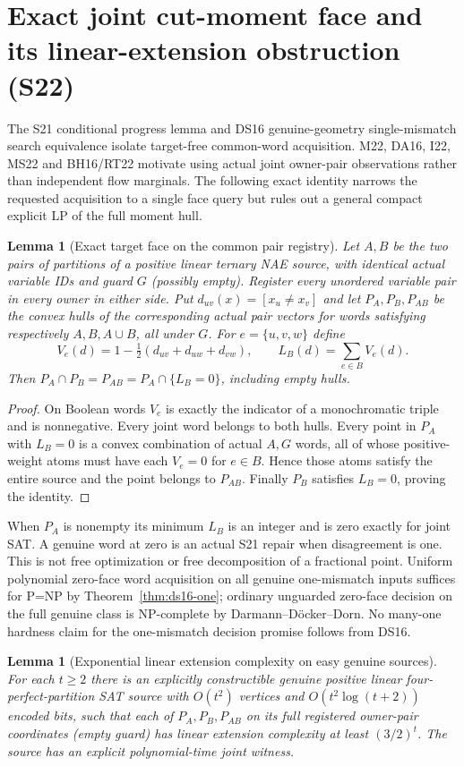 \documentclass[11pt]{article}
\newtheorem{lemma}[theorem]{Lemma}
\begin{document}
\section{Exact joint cut-moment face and its linear-extension obstruction (S22)}\label{sec:s22}
The S21 conditional progress lemma and DS16 genuine-geometry single-mismatch search equivalence isolate target-free common-word acquisition. M22, DA16, I22, MS22 and BH16/RT22 motivate using actual joint owner-pair observations rather than independent flow marginals. The following exact identity narrows the requested acquisition to a single face query but rules out a general compact explicit LP of the full moment hull.
\begin{lemma}[Exact target face on the common pair registry]\label{lem:s22-face}
Let $A,B$ be the two pairs of partitions of a positive linear ternary NAE source, with identical actual variable IDs and guard $G$ (possibly empty). Register every unordered variable pair in every owner in either side. Put $d_{uv}(x)=[x_u\ne x_v]$ and let $P_A,P_B,P_{AB}$ be the convex hulls of the corresponding actual pair vectors for words satisfying respectively $A,B,A\cup B$, all under $G$. For $e=\{u,v,w\}$ define
\[
V_e(d)=1-\tfrac12(d_{uv}+d_{uw}+d_{vw}),\qquad L_B(d)=\sum_{e\in B}V_e(d).
\]
Then $P_A\cap P_B=P_{AB}=P_A\cap\{L_B=0\}$, including empty hulls.
\end{lemma}
\begin{proof}
On Boolean words $V_e$ is exactly the indicator of a monochromatic triple and is nonnegative. Every joint word belongs to both hulls. Every point in $P_A$ with $L_B=0$ is a convex combination of actual $A,G$ words, all of whose positive-weight atoms must have each $V_e=0$ for $e\in B$. Hence those atoms satisfy the entire source and the point belongs to $P_{AB}$. Finally $P_B$ satisfies $L_B=0$, proving the identity.
\end{proof}
When $P_A$ is nonempty its minimum $L_B$ is an integer and is zero exactly for joint SAT. A genuine word at zero is an actual S21 repair when disagreement is one. This is not free optimization or free decomposition of a fractional point. Uniform polynomial zero-face word acquisition on all genuine one-mismatch inputs suffices for P=NP by Theorem~\ref{thm:ds16-one}; ordinary unguarded zero-face decision on the full genuine class is NP-complete by Darmann--D\"ocker--Dorn. No many-one hardness claim for the one-mismatch decision promise follows from DS16.
\begin{lemma}[Exponential linear extension complexity on easy genuine sources]\label{lem:s22-xc}
For each $t\ge2$ there is an explicitly constructible genuine positive linear four-perfect-partition SAT source with $O(t^2)$ vertices and $O(t^2\log(t+2))$ encoded bits, such that each of $P_A,P_B,P_{AB}$ on its full registered owner-pair coordinates (empty guard) has linear extension complexity at least $(3/2)^t$. The source has an explicit polynomial-time joint witness.
\end{lemma}
\end{document}
